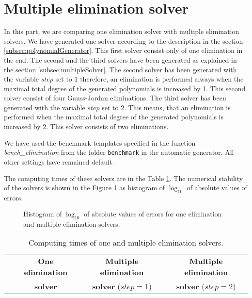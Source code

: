 \section{Multiple elimination solver}
In this part, we are comparing one elimination solver with multiple elimination solvers. We have generated one solver according to the description in the section \ref{subsec:polynomialGenerator}. This first solver consist only of one elimination in the end. The second and the third solvers have been generated as explained in the section \ref{subsec:multipleSolver}. The second solver has been generated with the variable $step$ set to 1 therefore, an elimination is performed always when the maximal total degree of the generated polynomials is increased by 1. This second solver consist of four Gauss-Jordan eliminations. The third solver has been generated with the variable $step$ set to 2. This means, that an elimination is performed when the maximal total degree of the generated polynomials is increased by 2. This solver consists of two eliminations.

We have used the benchmark templates specified in the function \textit{bench\_elimination} from the folder \texttt{benchmark} in the automatic generator. All other settings have remained default.

The computing times of these solvers are in the Table \ref{tab:elim}. The numerical stability of the solvers is shown in the Figure \ref{graph:elim} as histogram of $\log_{10}$ of absolute values of errors.

\begin{figure}[ht]
  \centering
  \resizebox{0.95\textwidth}{!}{}
  \caption{Histogram of $\log_{10}$ of absolute values of errors for one elimination and multiple elimination solvers.}
  \label{graph:elim}
\end{figure}

\begin{table}[ht]
  \centering
  \begin{tabular}{|c||ccc|}
    \hline
      & \textbf{One elimination} & \textbf{Multiple elimination} & \textbf{Multiple elimination} \\
      & \textbf{solver}          & \textbf{solver} ($step = 1$)  & \textbf{solver} ($step = 2$)\\
    \hline\hline
    
    \hline
  \end{tabular}
  \caption{Computing times of one and multiple elimination solvers.}
  \label{tab:elim}
\end{table}

